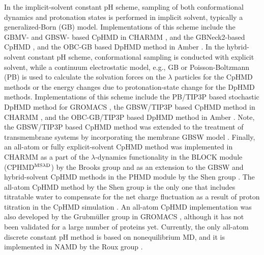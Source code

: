 In the implicit-solvent constant pH scheme, sampling of both conformational dynamics and protonation states is performed in implicit solvent, typically a generalized-Born (GB) model.
Implementations of this scheme include the GBMV-
\cite{Lee_Brooks_2003_J.Comput.Chem.} and 
GBSW- \cite{Im_Brooks_2003_J.Comput.Chem.} based CpHMD \cite{Lee_Brooks_2004_Proteins,Khandogin_Brooks_2005_Biophys.J.,Khandogin_Brooks_2006_Biochemistry} in CHARMM  \cite{Brooks_Karplus_2009_J.Comput.Chem.},
and the GBNeck2-based CpHMD
\cite{Huang_Shen_2018_J.Chem.Inf.Model.,Harris_Shen_2019_J.Chem.Inf.Model.},
and the OBC-GB \cite{Onufriev_Bashford_2002_J.Comput.Chem.}
based DpHMD method 
\cite{Mongan_McCammon_2004_J.Comput.Chem.}
in Amber \cite{Case_Kollman_2018_}.
In the hybrid-solvent constant pH scheme, conformational sampling
is conducted with explicit solvent, while a continuum
electrostatic model, e.g., GB or Poisson-Boltzmann (PB)
is used to calculate the solvation forces 
on the $\lambda$ particles for the CpHMD methods
or the energy changes due to protonation-state change
for the DpHMD methods.
Implementations of this scheme include
the PB/TIP3P based stochastic DpHMD method
\cite{Baptista_Soares_2002_J.Chem.Phys.}
for GROMACS \cite{Spoel_Berendsen_2005_J.Comput.Chem.},
the GBSW/TIP3P based CpHMD method \cite{Wallace_Shen_2011_J.Chem.TheoryComput.}
in CHARMM \cite{Brooks_Karplus_2009_J.Comput.Chem.},
and the OBC-GB/TIP3P based DpHMD method 
\cite{Swails_Roitberg_2014_J.Chem.TheoryComput.}
in Amber \cite{Case_Kollman_2018_}.
Note, the GBSW/TIP3P based CpHMD method \cite{Wallace_Shen_2011_J.Chem.TheoryComput.} was extended to the treatment of transmembrane systems \cite{Huang_Shen_2016_Nat.Commun.} by incorporating the membrane GBSW model \cite{Im_Brooks_2003_Biophys.J.}.
Finally, an all-atom or fully explicit-solvent
CpHMD method was implemented in CHARMM
\cite{Brooks_Karplus_2009_J.Comput.Chem.}
as a part of the $\lambda$-dynamics functionality
in the BLOCK module (CPHMD$^{\rm MS\lambda D}$) 
by the Brooks group \cite{Goh_Brooks_2014_Proteins}
and as an extension to the GBSW and hybrid-solvent CpHMD 
methods in the PHMD module by the Shen group
\cite{Wallace_Shen_2012_J.Chem.Phys.,Huang_Shen_2016_J.Chem.TheoryComput.}.
The all-atom CpHMD method by the Shen group is the only one that includes titratable water to compensate for the net charge fluctuation as a result of proton titration in the CpHMD simulation
\cite{Chen_Shen_2013_Biophys.J.}.
An all-atom CpHMD implementation was also developed by the
Grubm\"{u}ller group
\cite{Donnini_Grubmuller_2016_J.Chem.TheoryComput.}
in GROMACS
\cite{Spoel_Berendsen_2005_J.Comput.Chem.}, although it has not been validated for a large number of proteins yet.
Currently, the only all-atom discrete constant pH method is based on nonequilibrium MD,
and it is implemented in NAMD \cite{Phillips_Schulten_2005_J.Comput.Chem.}
by the Roux group
\cite{Chen_Roux_2015_J.Chem.TheoryComput.,Radak_Roux_2017_J.Chem.TheoryComput.}.

